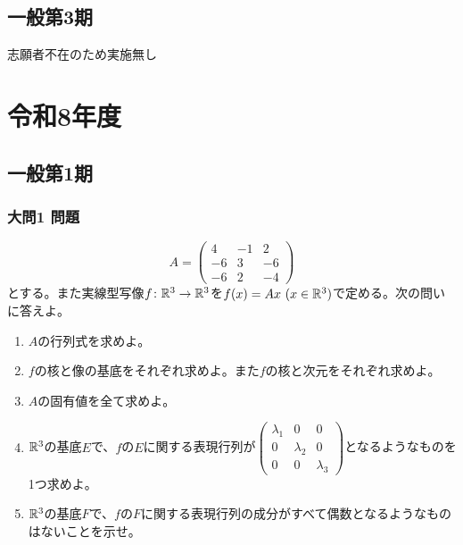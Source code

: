 \documentclass[dvipdfmx]{jsreport}
\begin{document}
\chapter{一般第3期}
	志願者不在のため実施無し

\part{令和8年度}
\chapter{一般第1期}
\section{大問1 問題}
\begin{tcolorbox} %
\begin{equation*}
    A=
    \begin{pmatrix}
        4& -1& 2\\
        -6& 3& -6\\
        -6& 2& -4
    \end{pmatrix}
\end{equation*}
    とする。また実線型写像$f\colon \mathbb{R}^3\to \mathbb{R}^3$を$f(x)= Ax\ (x\in \mathbb{R}^3)$で定める。次の問いに答えよ。
\begin{enumerate}
    \item $A$の行列式を求めよ。
    \item $f$の核と像の基底をそれぞれ求めよ。また$f$の核と次元をそれぞれ求めよ。
    \item $A$の固有値を全て求めよ。
    \item $\mathbb{R}^3$の基底$E$で、$f$の$E$に関する表現行列が$\begin{pmatrix}\lambda_1& 0& 0\\ 0& \lambda_2& 0\\ 0& 0& \lambda_3\end{pmatrix}$となるようなものを1つ求めよ。
    \item $\mathbb{R}^3$の基底$F$で、$f$の$F$に関する表現行列の成分がすべて偶数となるようなものはないことを示せ。
\end{enumerate}
\end{tcolorbox} 
\end{document}
